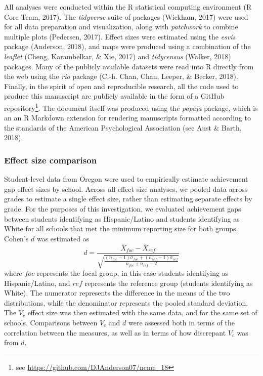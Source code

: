 \documentclass[man, fleqn, noextraspace]{apa6}
\theoremstyle{definition}
\theoremstyle{definition}
\theoremstyle{definition}
\theoremstyle{remark}
\begin{document}
All analyses were conducted within the R statistical computing
environment (R Core Team, 2017). The \emph{tidyverse} suite of packages
(Wickham, 2017) were used for all data preparation and visualization,
along with \emph{patchwork} to combine multiple plots (Pedersen, 2017).
Effect sizes were estimated using the \emph{esvis} package (Anderson,
2018), and maps were produced using a combination of the \emph{leaflet}
(Cheng, Karambelkar, \& Xie, 2017) and \emph{tidycensus} (Walker, 2018)
packages. Many of the publicly available datasets were read into R
directly from the web using the \emph{rio} package (C.-h. Chan, Chan,
Leeper, \& Becker, 2018). Finally, in the spirit of open and
reproducible research, all the code used to produce this manuscript are
publicly available in the form of a GitHub repository\footnote{see
  \url{https://github.com/DJAnderson07/ncme_18}}. The document itself
was produced using the \emph{papaja} package, which is an an R Markdown
extension for rendering manuscripts formatted according to the standards
of the American Psychological Association (see Aust \& Barth, 2018).

\hypertarget{effect-size-comparison}{%
\subsubsection{Effect size comparison}\label{effect-size-comparison}}

Student-level data from Oregon were used to empirically estimate
achievement gap effect sizes by school. Across all effect size analyses,
we pooled data across grades to estimate a single effect size, rather
than estimating separate effects by grade. For the purposes of this
investigation, we evaluated achievement gaps between students
identifying as Hispanic/Latino and students identifying as White for all
schools that met the minimum reporting size for both groups. Cohen's
\(d\) was estimated as \begin{equation}
d = \frac{\bar{X}_{foc} - \bar{X}_{ref}}
        {\sqrt{\frac{(n_{foc} - 1)\sigma_{foc} + (n_{ref} - 1)\sigma_{ref}}
                  {n_{foc} + n_{ref} - 2}}}
\end{equation} where \(foc\) represents the focal group, in this case
students identifying as Hispanic/Latino, and \(ref\) represents the
reference group (students identifying as White). The numerator
represents the difference in the means of the two distributions, while
the denominator represents the pooled standard deviation. The \(V_c\)
effect size was then estimated with the same data, and for the same set
of schools. Comparisons between \(V_c\) and \(d\) were assessed both in
terms of the correlation between the measures, as well as in terms of
how discrepant \(V_c\) was from \(d\).
\end{document}
